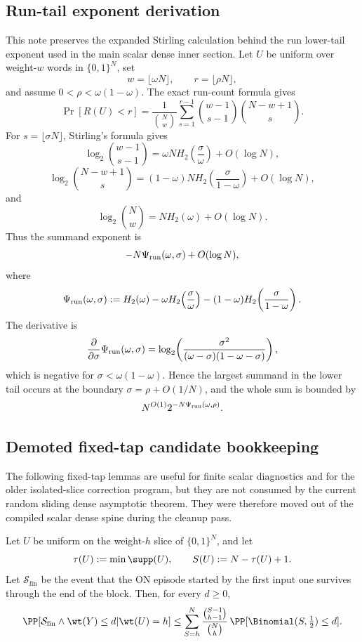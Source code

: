 \subsection{Run-tail exponent derivation}

This note preserves the expanded Stirling calculation behind the run lower-tail exponent used in the main scalar dense
inner section.  Let \(U\) be uniform over weight-\(w\) words in \(\{0,1\}^N\), set
\[
w=\lfloor\omega N\rfloor,\qquad r=\lfloor\rho N\rfloor,
\]
and assume \(0<\rho<\omega(1-\omega)\).  The exact run-count formula gives
\[
\Pr[R(U)<r]
=
\frac{1}{\binom{N}{w}}
\sum_{s=1}^{r-1}
\binom{w-1}{s-1}\binom{N-w+1}{s}.
\]
For \(s=\lfloor\sigma N\rfloor\), Stirling's formula gives
\[
\log_2\binom{w-1}{s-1}
=
\omega N H_2\!\left(\frac{\sigma}{\omega}\right)+O(\log N),
\]
\[
\log_2\binom{N-w+1}{s}
=
(1-\omega)N H_2\!\left(\frac{\sigma}{1-\omega}\right)+O(\log N),
\]
and
\[
\log_2\binom{N}{w}=NH_2(\omega)+O(\log N).
\]
Thus the summand exponent is
\[
-N\Psi_{\rm run}(\omega,\sigma)+O(\log N),
\]
where
\[
\Psi_{\rm run}(\omega,\sigma)
:=
H_2(\omega)
-\omega H_2\!\left(\frac{\sigma}{\omega}\right)
-(1-\omega)H_2\!\left(\frac{\sigma}{1-\omega}\right).
\]
The derivative is
\[
\frac{\partial}{\partial\sigma}\Psi_{\rm run}(\omega,\sigma)
=
\log_2\!\left(\frac{\sigma^2}{(\omega-\sigma)(1-\omega-\sigma)}\right),
\]
which is negative for \(\sigma<\omega(1-\omega)\).  Hence the largest summand in the lower tail occurs at the boundary
\(\sigma=\rho+O(1/N)\), and the whole sum is bounded by
\[
N^{O(1)}2^{-N\Psi_{\rm run}(\omega,\rho)}.
\]

\subsection{Demoted fixed-tap candidate bookkeeping}

The following fixed-tap lemmas are useful for finite scalar diagnostics and for the older isolated-slice correction
program, but they are not consumed by the current random sliding dense asymptotic theorem. They were therefore moved out
of the compiled scalar dense spine during the cleanup pass.

\begin{lemma}
\label{lem:fixedtap-final-survivor-suffix}
Let \(U\) be uniform on the weight-\(h\) slice of \(\{0,1\}^N\), and let
\[
\tau(U):=\min\supp(U),\qquad S(U):=N-\tau(U)+1.
\]
Let \(\mathcal{S}_{\mathrm{fin}}\) be the event that the ON episode started by the first input one survives through the
end of the block. Then, for every \(d\ge 0\),
\[
\PP\!\left[
\mathcal{S}_{\mathrm{fin}}\wedge \wt(Y)\le d
\middle| \wt(U)=h
\right]
\le
\sum_{S=h}^{N}
\frac{\binom{S-1}{h-1}}{\binom{N}{h}}\,
\PP[\Binomial(S,\tfrac12)\le d].
\]
\end{lemma}

